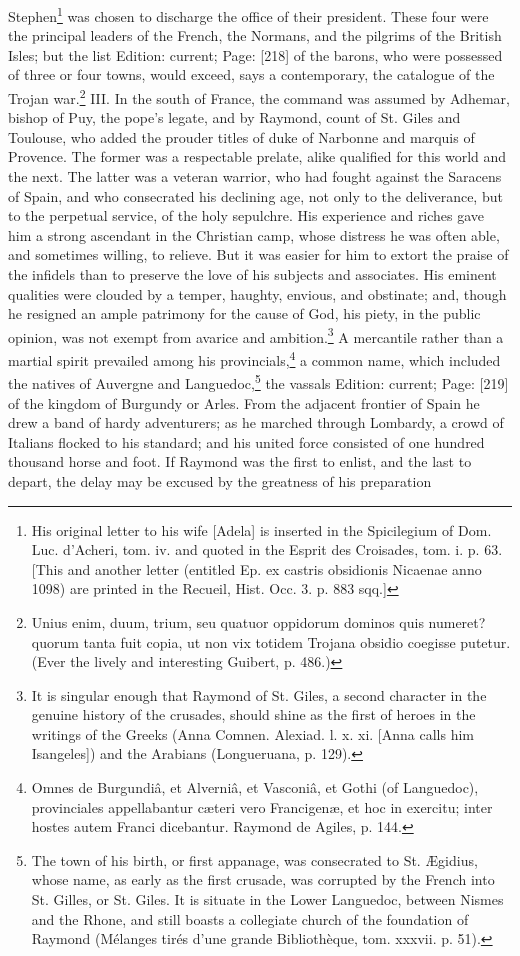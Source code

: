 Stephen\footnote{His original letter to his wife [Adela] is inserted in the Spicilegium of Dom. Luc. d\texthebrew{}’Acheri, tom. iv. and quoted in the Esprit des Croisades, tom. i. p. 63. [This and another letter (entitled Ep. ex castris obsidionis Nicaenae anno 1098) are printed in the Recueil, Hist. Occ. 3. p. 883 sqq.]} was chosen to discharge the office of their president. These four were the principal leaders of the French, the Normans, and the pilgrims of the British Isles; but the list Edition: current; Page: [218] of the barons, who were possessed of three or four towns, would exceed, says a contemporary, the catalogue of the Trojan war.\footnote{Unius enim, duum, trium, seu quatuor oppidorum dominos quis numeret? quorum tanta fuit copia, ut non vix totidem Trojana obsidio coegisse putetur. (Ever the lively and interesting Guibert, p. 486.)} III. In the south of France, the command was assumed by Adhemar, bishop of Puy, the pope\texthebrew{}’s legate, and by Raymond, count of St. Giles and Toulouse, who added the prouder titles of duke of Narbonne and marquis of Provence. The former was a respectable prelate, alike qualified for this world and the next. The latter was a veteran warrior, who had fought against the Saracens of Spain, and who consecrated his declining age, not only to the deliverance, but to the perpetual service, of the holy sepulchre. His experience and riches gave him a strong ascendant in the Christian camp, whose distress he was often able, and sometimes willing, to relieve. But it was easier for him to extort the praise of the infidels than to preserve the love of his subjects and associates. His eminent qualities were clouded by a temper, haughty, envious, and obstinate; and, though he resigned an ample patrimony for the cause of God, his piety, in the public opinion, was not exempt from avarice and ambition.\footnote{It is singular enough that Raymond of St. Giles, a second character in the genuine history of the crusades, should shine as the first of heroes in the writings of the Greeks (Anna Comnen. Alexiad. l. x. xi. [Anna calls him Isangeles]) and the Arabians (Longueruana, p. 129).} A mercantile rather than a martial spirit prevailed among his provincials,\footnote{Omnes de Burgundiâ, et Alverniâ, et Vasconiâ, et Gothi (of Languedoc), provinciales appellabantur cæteri vero Francigenæ, et hoc in exercitu; inter hostes autem Franci dicebantur. Raymond de Agiles, p. 144.} a common name, which included the natives of Auvergne and Languedoc,\footnote{The town of his birth, or first appanage, was consecrated to St. Ægidius, whose name, as early as the first crusade, was corrupted by the French into St. Gilles, or St. Giles. It is situate in the Lower Languedoc, between Nismes and the Rhone, and still boasts a collegiate church of the foundation of Raymond (Mélanges tirés d\texthebrew{}’une grande Bibliothèque, tom. xxxvii. p. 51).} the vassals Edition: current; Page: [219] of the kingdom of Burgundy or Arles. From the adjacent frontier of Spain he drew a band of hardy adventurers; as he marched through Lombardy, a crowd of Italians flocked to his standard; and his united force consisted of one hundred thousand horse and foot. If Raymond was the first to enlist, and the last to depart, the delay may be excused by the greatness of his preparation 
